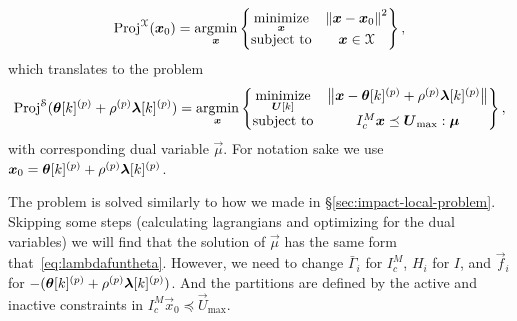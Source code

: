 \documentclass[../main.tex]{subfiles}
\begin{document}
\begin{equation}
  \operatorname{Proj}^{\mathcal{X}}(\boldsymbol{x}_{0})=
  \mathop{\arg\!\min}\limits_{\boldsymbol{x}}
  \left\{
    \begin{matrix}
      \mathop{\textrm{minimize}}\limits_{\boldsymbol{x}} &
                                   \left\lVert\boldsymbol{x}-\boldsymbol{x}_{0}\right\rVert^{2}\\
      \mathrm{subject~ to} & \boldsymbol{x}\in\mathcal{X}\\
    \end{matrix}
  \right\},
\end{equation}
which translates to the problem
\begin{equation}
  \label{eq:projected_subgradient_qp}
  \operatorname{Proj}^{\mathcal{S}}(\boldsymbol{\theta}[k]^{(p)}+\rho^{(p)}\boldsymbol{\lambda}[k]^{(p)})=
  \mathop{\arg\!\min}\limits_{\boldsymbol{x}}
  \left\{
    \begin{matrix}
      \mathop{\textrm{minimize}}\limits_{\boldsymbol{U}[k]} &
                                      \left\lVert\boldsymbol{x}-\boldsymbol{\theta}[k]^{(p)}+\rho^{(p)}\boldsymbol{\lambda}[k]^{(p)}\right\rVert\\
      \mathrm{subject~ to} & I_{c}^{M}\boldsymbol{x}\preceq \boldsymbol{U}_{\max}:\boldsymbol{\mu}\\
    \end{matrix}
  \right\},
\end{equation}
with corresponding dual variable $\vec{\mu}$.
For notation sake we use $\boldsymbol{x}_{0}=\boldsymbol{\theta}[k]^{(p)}+\rho^{(p)}\boldsymbol{\lambda}[k]^{(p)}$.

The problem is solved similarly to how we made in \S\ref{sec:impact-local-problem}.
Skipping some steps (calculating lagrangians and optimizing for the dual variables) we will find that the solution of $\vec{\mu}$ has the same form that~\eqref{eq:lambdafuntheta}.
However, we need to change $\bar{\Gamma}_{i}$ for $I_{c}^{M}$, $H_{i}$ for $I$, and $\vec{f}_{i}$ for $-(\boldsymbol{\theta}[k]^{(p)}+\rho^{(p)}\boldsymbol{\lambda}[k]^{(p)})$.
And the partitions are defined by the active and inactive constraints in $I_{c}^{M}\vec{x}_{0}\preceq \vec{U}_{\max}$.
\end{document}
